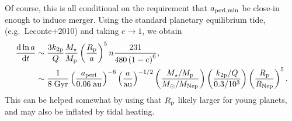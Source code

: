 \documentclass[11pt,
        usenames, %
        dvipsnames %
    ]{article}
\newcommand*{\rd}[2]{\frac{\mathrm{d}#1}{\mathrm{d}#2}}
\newcommand*{\p}[1]{\left(#1\right)}
\begin{document}
Of course, this is all conditional on the requirement that $a_{\rm peri, \min}$
be close-in enough to induce merger.
Using the standard planetary equilibrium tide, (e.g.\ Leconte+2010) and taking
$e \to 1$, we obtain
\begin{align}
    \rd{\ln a}{t}
        &\sim
            \frac{3k_{\rm 2p}}{Q}
            \frac{M_\star}{M_{\rm p}}
            \p{\frac{R_{\rm p}}{a}}^5 n
            \frac{231}{480\p{1 - e}^6},\\
        &\sim
            \frac{1}{8\;\mathrm{Gyr}}
            \p{\frac{a_{\rm peri}}{0.06\;\mathrm{au}}}^{-6}
            \p{\frac{a}{\mathrm{au}}}^{-1/2}
            \p{\frac{M_\star / M_{\rm p}}{M_{\odot} / M_{\rm Nep}}}
            \p{\frac{k_{\rm 2p} / Q}{0.3 / 10^3}}
            \p{\frac{R_{\rm p}}{R_{\rm Nep}}}^{5}.
\end{align}
This can be helped somewhat by using that $R_{\rm p}$ likely larger for young
planets, and may also be inflated by tidal heating.
\end{document}
